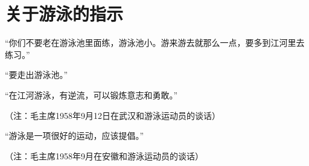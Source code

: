 \section[关于游泳的指示（一九五八年九月）]{关于游泳的指示}


“你们不要老在游泳池里面练，游泳池小。游来游去就那么一点，要多到江河里去练习。”

“要走出游泳池。”

“在江河游泳，有逆流，可以锻炼意志和勇敢。”

（注：毛主席1958年9月12日在武汉和游泳运动员的谈话）

“游泳是一项很好的运动，应该提倡。”

（注：毛主席1958年9月在安徽和游泳运动员的谈话）


